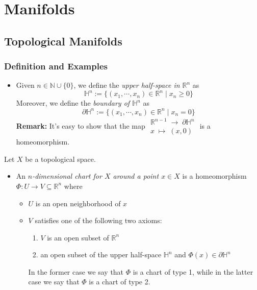 \chapter{Manifolds}

\section{Topological Manifolds}

\subsection{Definition and Examples}

\begin{definition}
    \begin{itemize}
        \item Given $n \in \mathbb{N} \cup \{0\}$, we define the \textit{upper half-space in $\mathbb{R}^n$} as
        $$\mathbb{H}^n := \{ (x_1, \cdots, x_n) \in \mathbb{R}^n \mid x_n \geq 0\} $$
        Moreover, we define the \textit{boundary of $\mathbb{H}^n$} as
        $$\partial\mathbb{H}^n := \{ (x_1, \cdots, x_n) \in \mathbb{R}^n \mid x_n=0\} $$
        \textbf{Remark:} It's easy to show that the map 
        $\substack{\mathbb{R}^{n-1} \;\to\; \partial \mathbb{H}^n\\
        x \;\mapsto\; (x,0)}$
        is a homeomorphism.
    \end{itemize}
    \noindent Let $X$ be a topological space.
    \begin{itemize}
        \item An \textit{$n$-dimensional chart for $X$ around a point $x \in X$} is a homeomorphism $\Phi: U \to V \subseteq \mathbb{R}^n$ where 
        \begin{itemize}
            \item $U$ is an open neighborhood of $x$
            \item $V$ satisfies one of the following two axioms:
            \begin{enumerate}
                \item $V$ is an open subset of $\mathbb{R}^n$
                \item an open subset of the upper half-space $\mathbb{H}^n$ and $\Phi(x) \in \partial \mathbb{H}^n$
            \end{enumerate}
            In the former case we say that $\Phi$ is a chart of type 1, while in the latter case we say that $\Phi$ is a chart of type 2.
        \end{itemize}


\end{itemize}
\end{definition}
